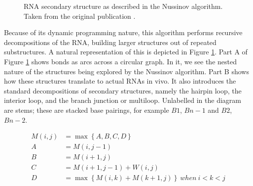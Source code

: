 \documentclass{cshonours}
\begin{document}
\begin{figure}
\begin{center}
\end{center}
\caption{RNA secondary structure as described in the Nussinov algorithm.
Taken from the original publication \cite{nussinov1980fast}.}
\label{nuss_rna}
\end{figure}



Because of its dynamic programming
nature, this algorithm performs recursive decompositions of the RNA, building
larger structures out of repeated substructures. A natural representation of this is
depicted in Figure \ref{nuss_rna}. Part A of Figure \ref{nuss_rna} shows bonds as arcs across a circular
graph. In it, we see the nested nature of the structures being explored by the
Nussinov algorithm. Part B shows how these structures translate to actual RNAs in vivo. It also introduces the standard decompositions
of secondary structures, namely the hairpin loop, the interior loop, and the branch
junction or multiloop. Unlabelled in the diagram are stems; these are stacked
base pairings, for example $B1$, $Bn - 1$ and $B2$, $Bn - 2$.

\begin{align} \label{eq:nuss_eq}
	M(i, j) &= \max \left\lbrace A, B, C, D \right\rbrace \nonumber  \\
	A &= M(i, j-1) \nonumber \\
	B &= M(i+1, j) \nonumber \\
	C &= M(i+1, j-1) + W(i, j) \nonumber \\
	D &= \max \left\lbrace M(i, k) + M(k+1, j) \right\rbrace \: when \: i < k < j \nonumber	\\
\end{align}
\end{document}
